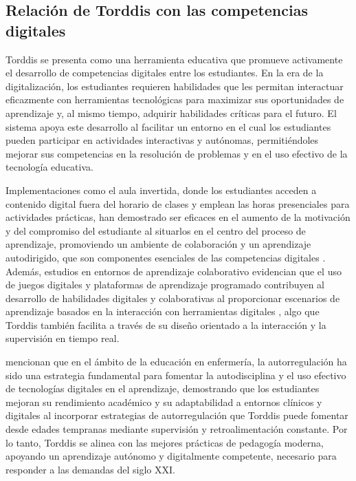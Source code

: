 \documentclass[a4paper,fleqn]{cas-sc}
\begin{document}
		\subsection{Relación de Torddis con las competencias digitales}
			Torddis se presenta como una herramienta educativa que promueve activamente el desarrollo de competencias digitales entre los estudiantes. En la era de la digitalización, los estudiantes requieren habilidades que les permitan interactuar eficazmente con herramientas tecnológicas para maximizar sus oportunidades de aprendizaje y, al mismo tiempo, adquirir habilidades críticas para el futuro. El sistema apoya este desarrollo al facilitar un entorno en el cual los estudiantes pueden participar en actividades interactivas y autónomas, permitiéndoles mejorar sus competencias en la resolución de problemas y en el uso efectivo de la tecnología educativa.
			
			Implementaciones como el aula invertida, donde los estudiantes acceden a contenido digital fuera del horario de clases y emplean las horas presenciales para actividades prácticas, han demostrado ser eficaces en el aumento de la motivación y del compromiso del estudiante al situarlos en el centro del proceso de aprendizaje, promoviendo un ambiente de colaboración y un aprendizaje autodirigido, que son componentes esenciales de las competencias digitales \citep{Mohamed2018Implementing}. Además, estudios en entornos de aprendizaje colaborativo evidencian que el uso de juegos digitales y plataformas de aprendizaje programado contribuyen al desarrollo de habilidades digitales y colaborativas al proporcionar escenarios de aprendizaje basados en la interacción con herramientas digitales \citep{Echeverria2011AFramework}, algo que Torddis también facilita a través de su diseño orientado a la interacción y la supervisión en tiempo real.
			
			\cite{Coffman2024Developing} mencionan que en el ámbito de la educación en enfermería, la autorregulación ha sido una estrategia fundamental para fomentar la autodisciplina y el uso efectivo de tecnologías digitales en el aprendizaje, demostrando que los estudiantes mejoran su rendimiento académico y su adaptabilidad a entornos clínicos y digitales al incorporar estrategias de autorregulación que Torddis puede fomentar desde edades tempranas mediante supervisión y retroalimentación constante. Por lo tanto, Torddis se alinea con las mejores prácticas de pedagogía moderna, apoyando un aprendizaje autónomo y digitalmente competente, necesario para responder a las demandas del siglo XXI.
	
\end{document}
